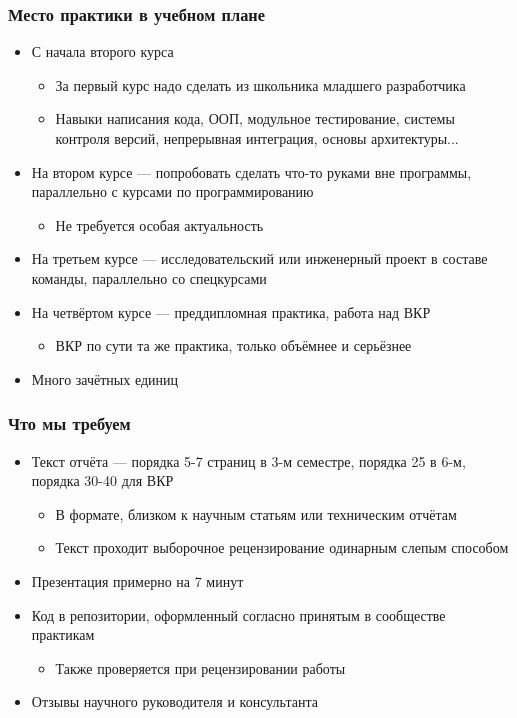 \documentclass[xetex,mathserif,serif]{beamer}
\begin{document}
    \begin{frame}
        \frametitle{Место практики в учебном плане}
        \begin{itemize}
            \item С начала второго курса
            \begin{itemize}
                \item За первый курс надо сделать из школьника младшего разработчика
                \item Навыки написания кода, ООП, модульное тестирование, системы контроля версий, непрерывная интеграция, основы архитектуры...
            \end{itemize}
            \item На втором курсе --- попробовать сделать что-то руками вне программы, параллельно с курсами по программированию
            \begin{itemize}
                \item Не требуется особая актуальность
            \end{itemize}
            \item На третьем курсе --- исследовательский или инженерный проект в составе команды, параллельно со спецкурсами
            \item На четвёртом курсе --- преддипломная практика, работа над ВКР
            \begin{itemize}
                \item ВКР по сути та же практика, только объёмнее и серьёзнее
            \end{itemize}
            \item Много зачётных единиц
        \end{itemize}
    \end{frame}

    \begin{frame}
        \frametitle{Что мы требуем}
        \begin{itemize}
            \item Текст отчёта --- порядка 5-7 страниц в 3-м семестре, порядка 25 в 6-м, порядка 30-40 для ВКР
            \begin{itemize}
                \item В формате, близком к научным статьям или техническим отчётам
                \item Текст проходит выборочное рецензирование одинарным слепым способом
            \end{itemize}
            \item Презентация примерно на 7 минут
            \item Код в репозитории, оформленный согласно принятым в сообществе практикам
            \begin{itemize}
                \item Также проверяется при рецензировании работы
            \end{itemize}
            \item Отзывы научного руководителя и консультанта
        \end{itemize}
    \end{frame}
\end{document}
